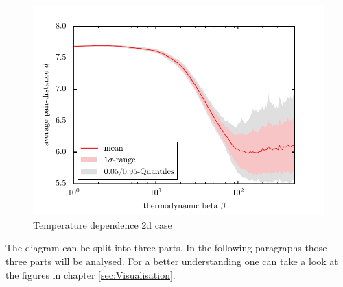 \documentclass[11pt, a4paper]{article}
\numberwithin{equation}{section}
\begin{document}
\begin{figure}[!h]
	\centering
	\includegraphics{./figures/temp_dep_coulomb2d.pdf}
	\caption{Temperature dependence 2d case}
	\label{Fig:Temp_dep_Cou2D}
\end{figure}

The diagram can be split into three parts.
In the following paragraphs those three parts will be analysed.
For a better understanding one can take a look at the figures in chapter \ref{sec:Visualisation}.
\end{document}
